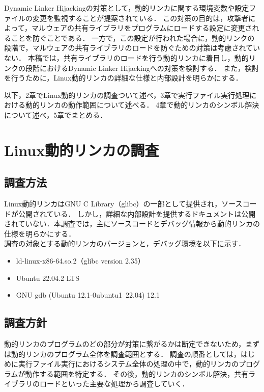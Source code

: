 \documentclass[submit,techreq,noauthor,dvipdfmx]{mid-eco}
\begin{document}
Dynamic Linker Hijackingの対策として，動的リンカに関する環境変数や設定ファイルの変更を監視することが提案されている\cite{MITRE-ATT&CK}．
この対策の目的は，攻撃者によって，マルウェアの共有ライブラリをプログラムにロードする設定に変更されることを防ぐことである．
一方で，この設定が行われた場合に，動的リンクの段階で，マルウェアの共有ライブラリのロードを防ぐための対策は考慮されていない．
本稿では，共有ライブラリのロードを行う動的リンカに着目し，動的リンクの段階におけるDynamic Linker Hijackingへの対策を検討する．
また，検討を行うために，Linux動的リンカの詳細な仕様と内部設計を明らかにする．


以下，2章でLinux動的リンカの調査ついて述べ，3章で実行ファイル実行処理における動的リンカの動作範囲について述べる．
4章で動的リンカのシンボル解決について述べ，5章でまとめる．\\

\section{Linux動的リンカの調査}
\subsection{調査方法}
Linux動的リンカはGNU C Library（glibc）の一部として提供され，ソースコードが公開されている\cite{glibc}．
しかし，詳細な内部設計を提供するドキュメントは公開されていない．本調査では，主にソースコードとデバッグ情報から動的リンカの仕様を明らかにする．\\
調査の対象とする動的リンカのバージョンと，デバッグ環境を以下に示す．

  \begin{itemize}
   \item ld-linux-x86-64.so.2（glibc version 2.35）
   \item Ubuntu 22.04.2 LTS
   \item GNU gdb (Ubuntu 12.1-0ubuntu1~22.04) 12.1
  \end{itemize}


\subsection{調査方針}
動的リンカのプログラムのどの部分が対策に繋がるかは断定できないため，まずは動的リンカのプログラム全体を調査範囲とする．
調査の順番としては，はじめに実行ファイル実行におけるシステム全体の処理の中で，動的リンカのプログラムが動作する範囲を特定する．
その後，動的リンカのシンボル解決，共有ライブラリのロードといった主要な処理から調査していく．　\\
\end{document}
